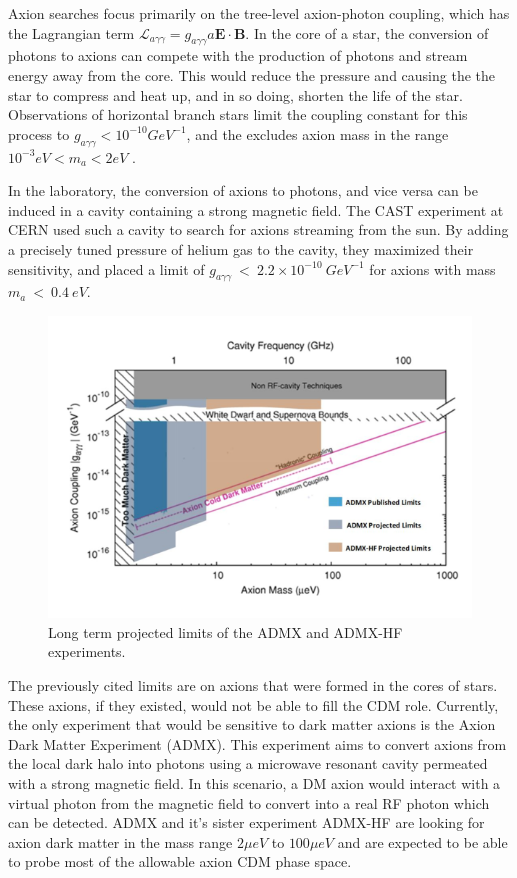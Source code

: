 Axion searches focus primarily on the tree-level axion-photon coupling, which has the Lagrangian term $\mathcal{L}_{a \gamma \gamma}=g_{a \gamma \gamma}a\mathbf{E \cdot B}$. In the core of a star, the conversion of photons to axions can compete with the production of photons and stream energy away from the core. This would reduce the pressure and causing the the star to compress and heat up, and in so doing, shorten the life of the star. Observations of horizontal branch stars limit the coupling constant for this process to  $g_{a \gamma \gamma}   <10^{-10} GeV^{-1}$, and the excludes axion mass in the range $10^{-3} eV < m_{a} < 2 eV$ \cite{axion_DM, axion_photon}.

In the laboratory, the conversion of axions to photons, and vice versa can be induced in a cavity containing a strong magnetic field. The CAST experiment at CERN used such a cavity to search for axions streaming from the sun. By adding a precisely tuned pressure of helium gas to the cavity, they maximized their sensitivity, and placed a limit of $g_{a \gamma \gamma} \ < \ 2.2 \times 10^{-10} \ GeV^{-1}$ for axions with mass $m_{a} \ < \ 0.4 \ eV$\cite{axion_DM,axion_photon}.
\begin{figure}[h!]
\centering
\includegraphics[width=150mm]{Figures/ADMX.png}
\caption{Long term projected limits of the ADMX and ADMX-HF experiments. \cite{ADMX}}
\label{fig:admx} 
\end{figure}

The previously cited limits are on axions that were formed in the cores of stars. These axions, if they existed, would not be able to fill the CDM role. Currently, the only experiment that would be sensitive to dark matter axions is the Axion Dark Matter Experiment (ADMX). This experiment aims to convert axions from the local dark halo into photons using a microwave resonant cavity permeated with a strong magnetic field. In this scenario, a DM axion would interact with a virtual photon from the magnetic field to convert into a real RF photon which can be detected. ADMX and it's sister experiment ADMX-HF are looking for axion dark matter in the mass range $2 \mu eV$ to $100 \mu eV$ and are expected to be able to probe most of the allowable axion CDM phase space\cite{axion_DM,ADMX}.





